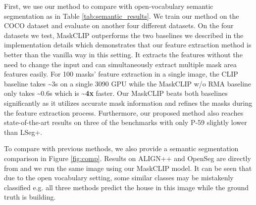 \documentclass{article}
\theoremstyle{plain}
\theoremstyle{definition}
\theoremstyle{remark}
\begin{document}
First, we use our method to compare with open-vocabulary semantic segmentation as in Table \ref{tab:semantic_results}. We train our method on the COCO dataset and evaluate on another four different datasets. On the four datasets we test, MaskCLIP outperforms the two baselines we described in the implementation details which demonstrates that our feature extraction method is better than the vanilla way in this setting. It extracts the features without the need to change the input and can simultaneously extract multiple mask area features easily. For 100 masks' feature extraction in a single image, the CLIP baseline takes \textasciitilde 3s on a single 3090 GPU while the MaskCLIP w/o RMA baseline only takes \textasciitilde 0.6s which is \textbf{\textasciitilde 4x} faster. Our MaskCLIP beats both baselines significantly as it utilizes accurate mask information and refines the masks during the feature extraction process. Furthermore, our proposed method also reaches state-of-the-art results on three of the benchmarks with only P-59 slightly lower than LSeg+\cite{li2022language}.

To compare with previous methods, we also provide a semantic segmentation comparison in Figure \ref{fig:comp}. Results on ALIGN++ and OpenSeg are directly from  \citep{ghiasi2021open} and we run the same image using our MaskCLIP model. It can be seen that due to the open vocabulary setting, some similar classes may be mistakenly classified e.g. all three methods predict the house in this image while the ground truth is building.


\begin{table*}[!htbp]
\begin{center}
\caption{\small \textbf{Results on open-vocabulary panoptic segmentation using the ADE20k validation dataset.} th and st represent thing and stuff classes respectively. }
\label{tab:ade20k_val_results}
\end{center}
\end{table*}
\end{document}
